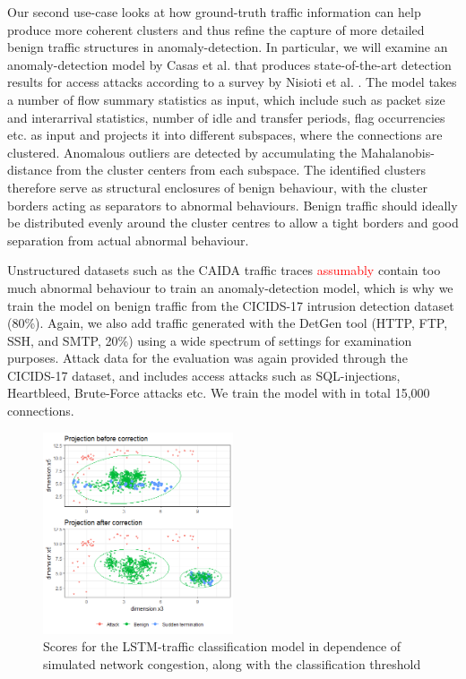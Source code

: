 \documentclass[sigconf]{acmart}
\begin{document}
Our second use-case looks at how ground-truth traffic information can help produce more coherent clusters and thus refine the capture of more detailed benign traffic structures in anomaly-detection. In particular, we will examine an anomaly-detection model by Casas et al. \cite{casas2012unsupervised} that produces state-of-the-art detection results for access attacks according to a survey by Nisioti et al. \cite{nisioti2018intrusion}.
The model takes a number of flow summary statistics as input, which include such as packet size and interarrival statistics, number of idle and transfer periods, flag occurrencies etc. as input and projects it into different subspaces, where the connections are clustered. Anomalous outliers are detected by accumulating the Mahalanobis-distance from the cluster centers from each subspace. The identified clusters therefore serve as structural enclosures of benign behaviour, with the cluster borders acting as separators to abnormal behaviours. Benign traffic should ideally be distributed evenly around the cluster centres to allow a tight borders and good separation from actual abnormal behaviour.

Unstructured datasets such as the CAIDA traffic traces \textcolor{red}{assumably} contain too much abnormal behaviour to train an anomaly-detection model, which is why we train the model on benign traffic from the CICIDS-17 intrusion detection dataset (80\%). Again, we also add traffic generated with the DetGen tool (HTTP, FTP, SSH, and SMTP, 20\%) using a wide spectrum of settings for examination purposes. Attack data for the evaluation was again provided through the CICIDS-17 dataset, and includes access attacks such as SQL-injections, Heartbleed, Brute-Force attacks etc. We  train the model with in total 15,000 connections.


\begin{figure}
\centering
\includegraphics[width=0.5\textwidth]{images/Subspace_projection_new2.png}
\caption{Scores for the LSTM-traffic classification model in dependence of simulated network congestion, along with the classification threshold}\label{fig:Subspace_projection}
\end{figure}
\end{document}
